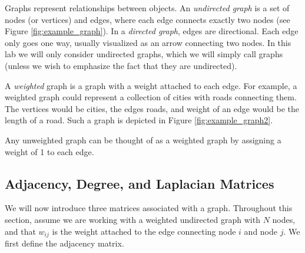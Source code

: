 %
%



Graphs represent relationships between objects.
An \emph{undirected graph} is a set of nodes (or vertices) and edges, where each edge connects exactly two nodes (see Figure \ref{fig:example_graph}).
In a \emph{directed graph}, edges are directional. Each edge only goes one way, usually visualized as an arrow connecting two nodes.
In this lab we will only consider undirected graphs, which we will simply call graphs (unless we wish to emphasize the fact that they are undirected).


A \emph{weighted} graph is a graph with a weight attached to each edge.
For example, a weighted graph could represent a collection of cities with roads connecting them.
The vertices would be cities, the edges roads, and weight of an edge would be the length of a road.
Such a graph is depicted in Figure \ref{fig:example_graph2}.

Any unweighted graph can be thought of as a weighted graph by assigning a weight of 1 to each edge.

\subsection*{Adjacency, Degree, and Laplacian Matrices}
We will now introduce three matrices associated with a graph. 
Throughout this section, assume we are working with a weighted undirected graph with $N$ nodes, and that $w_{ij}$ is the weight attached to the edge connecting node $i$ and node $j$.
We first define the adjacency matrix.

